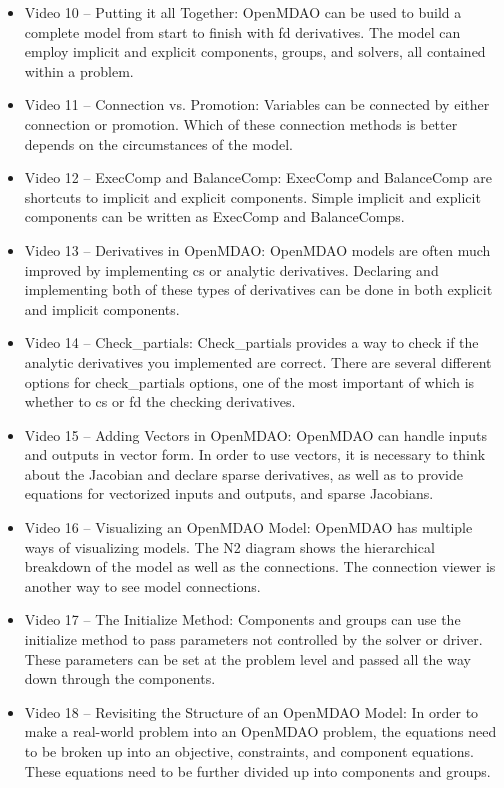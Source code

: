 \documentclass[12pt, letterpaper]{article}
\begin{document}
\begin{itemize}
	\item Video 10 – Putting it all Together: OpenMDAO can be used to build a complete model from start to finish with fd derivatives. The model can employ implicit and explicit components, groups, and solvers, all contained within a problem.
	\item Video 11 – Connection vs. Promotion: Variables can be connected by either connection or promotion. Which of these connection methods is better depends on the circumstances of the model.
	\item Video 12 – ExecComp and BalanceComp: ExecComp and BalanceComp are shortcuts to implicit and explicit components. Simple implicit and explicit components can be written as ExecComp and BalanceComps.
	\item Video 13 – Derivatives in OpenMDAO: OpenMDAO models are often much improved by implementing cs or analytic derivatives. Declaring and implementing both of these types of derivatives can be done in both explicit and implicit components.
	\item Video 14 – Check\_partials: Check\_partials provides a way to check if the analytic derivatives you implemented are correct. There are several different options for check\_partials options, one of the most important of which is whether to cs or fd the checking derivatives.
	\item Video 15 – Adding Vectors in OpenMDAO: OpenMDAO can handle inputs and outputs in vector form. In order to use vectors, it is necessary to think about the Jacobian and declare sparse derivatives, as well as to provide equations for vectorized inputs and outputs, and sparse Jacobians.
	\item Video 16 – Visualizing an OpenMDAO Model: OpenMDAO has multiple ways of visualizing models. The N2 diagram shows the hierarchical breakdown of the model as well as the connections. The connection viewer is another way to see model connections.
	\item Video 17 – The Initialize Method: Components and groups can use the initialize method to pass parameters not controlled by the solver or driver. These parameters can be set at the problem level and passed all the way down through the components.
	\item Video 18 – Revisiting the Structure of an OpenMDAO Model: In order to make a real-world problem into an OpenMDAO problem, the equations need to be broken up into an objective, constraints, and component equations. These equations need to be further divided up into components and groups.

\end{itemize}
\end{document}
